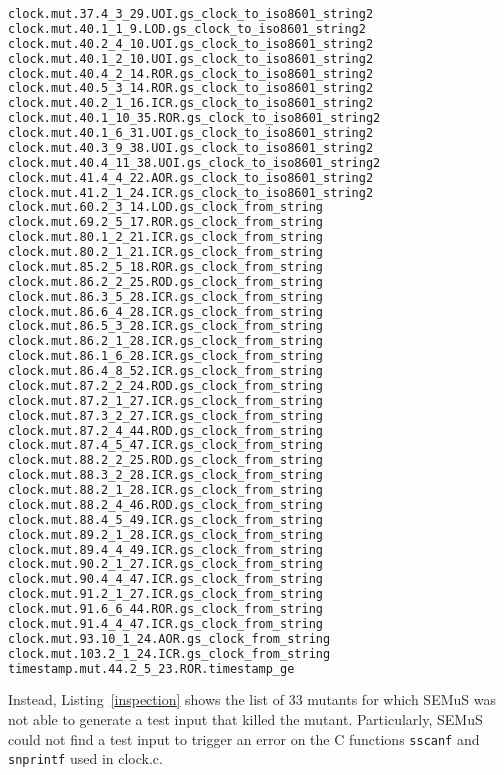 \begin{lstlisting}[language=bash, label=lik_equiv, caption=Likely equivalent mutants.]
clock.mut.37.4_3_29.UOI.gs_clock_to_iso8601_string2
clock.mut.40.1_1_9.LOD.gs_clock_to_iso8601_string2
clock.mut.40.2_4_10.UOI.gs_clock_to_iso8601_string2
clock.mut.40.1_2_10.UOI.gs_clock_to_iso8601_string2
clock.mut.40.4_2_14.ROR.gs_clock_to_iso8601_string2
clock.mut.40.5_3_14.ROR.gs_clock_to_iso8601_string2
clock.mut.40.2_1_16.ICR.gs_clock_to_iso8601_string2
clock.mut.40.1_10_35.ROR.gs_clock_to_iso8601_string2
clock.mut.40.1_6_31.UOI.gs_clock_to_iso8601_string2
clock.mut.40.3_9_38.UOI.gs_clock_to_iso8601_string2
clock.mut.40.4_11_38.UOI.gs_clock_to_iso8601_string2
clock.mut.41.4_4_22.AOR.gs_clock_to_iso8601_string2
clock.mut.41.2_1_24.ICR.gs_clock_to_iso8601_string2
clock.mut.60.2_3_14.LOD.gs_clock_from_string
clock.mut.69.2_5_17.ROR.gs_clock_from_string
clock.mut.80.1_2_21.ICR.gs_clock_from_string
clock.mut.80.2_1_21.ICR.gs_clock_from_string
clock.mut.85.2_5_18.ROR.gs_clock_from_string
clock.mut.86.2_2_25.ROD.gs_clock_from_string
clock.mut.86.3_5_28.ICR.gs_clock_from_string
clock.mut.86.6_4_28.ICR.gs_clock_from_string
clock.mut.86.5_3_28.ICR.gs_clock_from_string
clock.mut.86.2_1_28.ICR.gs_clock_from_string
clock.mut.86.1_6_28.ICR.gs_clock_from_string
clock.mut.86.4_8_52.ICR.gs_clock_from_string
clock.mut.87.2_2_24.ROD.gs_clock_from_string
clock.mut.87.2_1_27.ICR.gs_clock_from_string
clock.mut.87.3_2_27.ICR.gs_clock_from_string
clock.mut.87.2_4_44.ROD.gs_clock_from_string
clock.mut.87.4_5_47.ICR.gs_clock_from_string
clock.mut.88.2_2_25.ROD.gs_clock_from_string
clock.mut.88.3_2_28.ICR.gs_clock_from_string
clock.mut.88.2_1_28.ICR.gs_clock_from_string
clock.mut.88.2_4_46.ROD.gs_clock_from_string
clock.mut.88.4_5_49.ICR.gs_clock_from_string
clock.mut.89.2_1_28.ICR.gs_clock_from_string
clock.mut.89.4_4_49.ICR.gs_clock_from_string
clock.mut.90.2_1_27.ICR.gs_clock_from_string
clock.mut.90.4_4_47.ICR.gs_clock_from_string
clock.mut.91.2_1_27.ICR.gs_clock_from_string
clock.mut.91.6_6_44.ROR.gs_clock_from_string
clock.mut.91.4_4_47.ICR.gs_clock_from_string
clock.mut.93.10_1_24.AOR.gs_clock_from_string
clock.mut.103.2_1_24.ICR.gs_clock_from_string
timestamp.mut.44.2_5_23.ROR.timestamp_ge
\end{lstlisting}

Instead, Listing~\ref{inspection} shows the list of 33 mutants for which SEMuS was not able to generate a test input that killed the mutant. Particularly, SEMuS could not find a test input to trigger an error on the C functions \texttt{sscanf} and \texttt{snprintf} used in clock.c.

